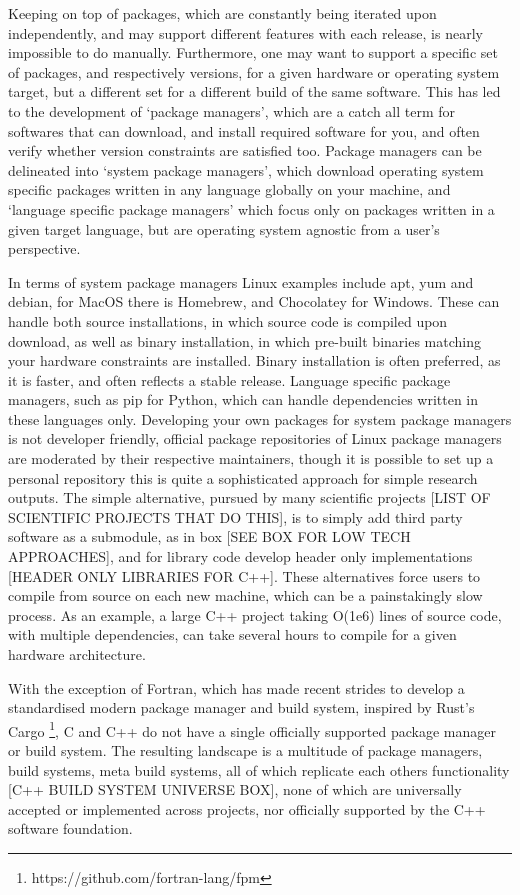 Keeping on top of packages, which are constantly being iterated upon independently, and may support different features with each release, is nearly impossible to do manually. Furthermore, one may want to support a specific set of packages, and respectively versions, for a given hardware or operating system target, but a different set for a different build of the same software. This has led to the development of `package managers', which are a catch all term for softwares that can download, and install required software for you, and often verify whether version constraints are satisfied too. Package managers can be delineated into `system package managers', which download operating system specific packages written in any language globally on your machine, and `language specific package managers' which focus only on packages written in a given target language, but are operating system agnostic from a user's perspective.

In terms of system package managers Linux examples include apt, yum and debian, for MacOS there is Homebrew, and Chocolatey for Windows. These can handle both source installations, in which source code is compiled upon download, as well as binary installation, in which pre-built binaries matching your hardware constraints are installed. Binary installation is often preferred, as it is faster, and often reflects a stable release. Language specific package managers, such as pip for Python, which can handle dependencies written in these languages only. Developing your own packages for system package managers is not developer friendly, official package repositories of Linux package managers are moderated by their respective maintainers, though it is possible to set up a personal repository this is quite a sophisticated approach for simple research outputs. The simple alternative, pursued by many scientific projects [LIST OF SCIENTIFIC PROJECTS THAT DO THIS], is to simply add third party software as a submodule, as in box [SEE BOX FOR LOW TECH APPROACHES], and for library code develop header only implementations [HEADER ONLY LIBRARIES FOR C++]. These alternatives force users to compile from source on each new machine, which can be a painstakingly slow process. As an example, a large C++ project taking O(1e6) lines of source code, with multiple dependencies, can take several hours to compile for a given hardware architecture.

With the exception of Fortran, which has made recent strides to develop a standardised modern package manager and build system, inspired by Rust's Cargo \footnote{https://github.com/fortran-lang/fpm}, C and C++ do not have a single officially supported package manager or build system. The resulting landscape is a multitude of package managers, build systems, meta build systems, all of which replicate each others functionality [C++ BUILD SYSTEM UNIVERSE BOX], none of which are universally accepted or implemented across projects, nor officially supported by the C++ software foundation.

